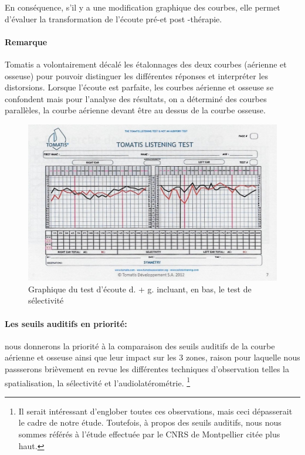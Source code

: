  En  conséquence,  s'il y a une modification
          graphique des courbes, elle 
          permet d'évaluer la transformation de l'écoute pré-et
          post -thérapie.
          

 
 







\paragraph{Remarque}


Tomatis a volontairement décalé les étalonnages des deux courbes (aérienne
	et osseuse) pour pouvoir distinguer les différentes réponses et interpréter
	les distorsions. Lorsque l'écoute est parfaite, les
	courbes aérienne et osseuse se confondent mais pour l'analyse des
	résultats, on a déterminé des courbes parallèles, la courbe aérienne
	devant être au dessus de la courbe osseuse.


\begin{figure}
	\centering
	\includegraphics[width=0.7\linewidth]{images/tomatisListeningTest.jpg}
	\caption[Graphique du test d'écoute]{Graphique du test
          d'écoute d. + g. incluant, en bas, le test de sélectivité}
	\label{fig:tomatislisteningtest}
\end{figure}


\paragraph{Les seuils auditifs en priorité:} 
nous donnerons la priorité à la comparaison 
des seuils auditifs de la courbe aérienne et osseuse ainsi que leur impact sur les 3 zones,
 raison pour laquelle nous passserons brièvement en revue les
différentes techniques d'observation telles la
spatialisation, la
sélectivité et l'audiolatérométrie.
\footnote{ Il serait intéressant d'englober toutes ces observations, 
  mais ceci dépasserait le cadre de notre étude. Toutefois, à propos des seuils
  auditifs, nous nous sommes référés à  
l'étude effectuée par le CNRS de Montpellier citée plus haut.}


